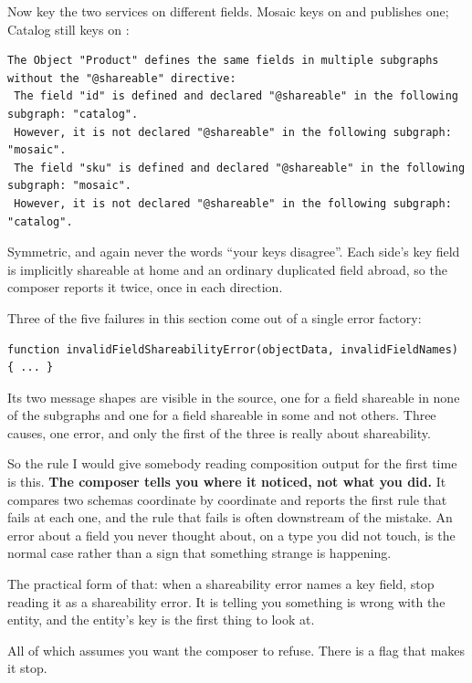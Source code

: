 Now key the two services on different fields. Mosaic keys on  and
publishes one; Catalog still keys on :

\begin{verbatim}
The Object "Product" defines the same fields in multiple subgraphs without the "@shareable" directive:
 The field "id" is defined and declared "@shareable" in the following subgraph: "catalog".
 However, it is not declared "@shareable" in the following subgraph: "mosaic".
 The field "sku" is defined and declared "@shareable" in the following subgraph: "mosaic".
 However, it is not declared "@shareable" in the following subgraph: "catalog".
\end{verbatim}

Symmetric, and again never the words \enquote{your keys disagree}. Each side's
key field is implicitly shareable at home and an ordinary duplicated field
abroad, so the composer reports it twice, once in each direction.

%
Three of the five failures in this section come out of a single error factory:

\begin{verbatim}
function invalidFieldShareabilityError(objectData, invalidFieldNames) { ... }
\end{verbatim}

Its two message shapes are visible in the source, one for a field shareable in
none of the subgraphs and one for a field shareable in some and not others.
Three causes, one error, and only the first of the three is really about
shareability.

\medskip
So the rule I would give somebody reading composition output for the first time
is this. \textbf{The composer tells you where it noticed, not what you did.} It
compares two schemas coordinate by coordinate and reports the first rule that
fails at each one, and the rule that fails is often downstream of the mistake.
An error about a field you never thought about, on a type you did not touch, is
the normal case rather than a sign that something strange is happening.

The practical form of that: when a shareability error names a key field, stop
reading it as a shareability error. It is telling you something is wrong with
the entity, and the entity's key is the first thing to look at.

All of which assumes you want the composer to refuse. There is a flag that
makes it stop.

%
